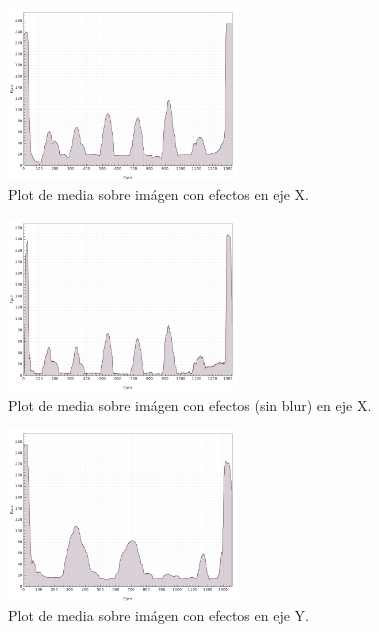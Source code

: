 \begin{figure}[H]
	\vspace{-0.2cm}
	\centering
	\includegraphics[width=230px]{imagenes-jtlc/experimento/search-cut-points/plot-x}
	\centering
	\caption{Plot de media sobre im\'agen con efectos en eje X.}
	\label{fig:font-sc-plot-x}
	\vspace{-0.15cm}
\end{figure}
\begin{figure}[H]
	\vspace{-0.2cm}
	\centering
	\includegraphics[width=230px]{imagenes-jtlc/experimento/search-cut-points/plot-x-no-blur}
	\centering
	\caption{Plot de media sobre im\'agen con efectos (sin blur) en eje X.}
	\label{fig:font-sc-plot-x-s-blur}
	\vspace{-0.15cm}
\end{figure}
\begin{figure}[H]
	\vspace{-0.2cm}
	\centering
	\includegraphics[width=230px]{imagenes-jtlc/experimento/search-cut-points/plot-y}
	\centering
	\caption{Plot de media sobre im\'agen con efectos en eje Y.}
	\label{fig:font-sc-plot-y}
	\vspace{-0.15cm}
\end{figure}
